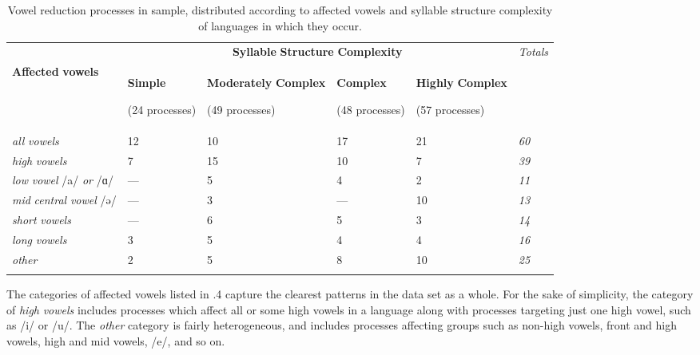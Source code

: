 \begin{table}
\begin{tabularx}{\textwidth}{XXXXXX}
\lsptoprule
 & \multicolumn{4}{c}{ \textbf{Syllable} \textbf{Structure} \textbf{Complexity}} & \textit{Totals}\\
 \textbf{Affected} \textbf{vowels} & { \textbf{Simple}}

 (24 processes) & { \textbf{Moderately} \textbf{Complex}}

 (49 processes) & { \textbf{Complex}}

 (48 processes) & { \textbf{Highly} \textbf{Complex}}

 (57 processes) & \\
 \textit{all} \textit{vowels} & 12 & 10 & 17 & 21 & \textit{60}\\
 \textit{high} \textit{vowels} & 7 & 15 & 10 & 7 & \textit{39}\\
 \textit{low} \textit{vowel} /a/ \textit{or} /ɑ/ & — & 5 & 4 & 2 & \textit{11}\\
 \textit{mid} \textit{central} \textit{vowel} /ə/ & — & 3 & — & 10 & \textit{13}\\
 \textit{short} \textit{vowels} & — & 6 & 5 & 3 & \textit{14}\\
 \textit{long} \textit{vowels} & 3 & 5 & 4 & 4 & \textit{16}\\
 \textit{other} & 2 & 5 & 8 & 10 & \textit{25}\\
\lspbottomrule
\end{tabularx}
\caption{\label{6.4}Vowel reduction processes in sample, distributed according to affected vowels and syllable structure complexity of languages in which they occur.}
\end{table}

The categories of affected vowels listed in .4 capture the clearest patterns in the data set as a whole. For the sake of simplicity, the category of \textit{high} \textit{vowels} includes processes which affect all or some high vowels in a language along with processes targeting just one high vowel, such as /i/ or /u/. The \textit{other} category is fairly heterogeneous, and includes processes affecting groups such as non-high vowels, front and high vowels, high and mid vowels, /e/, and so on.

